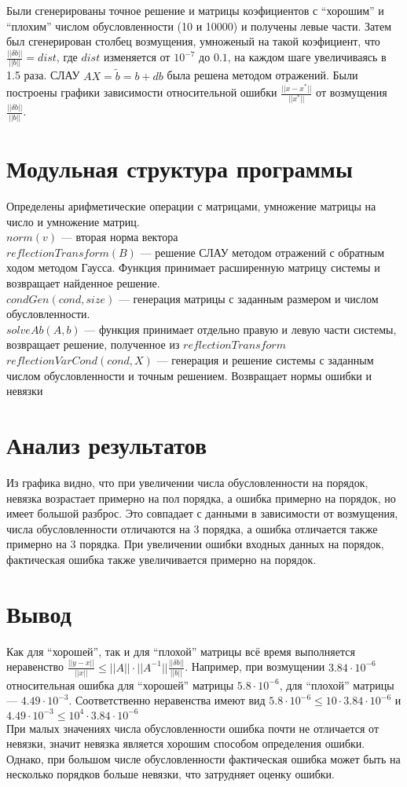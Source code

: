 \documentclass[11pt,a4paper]{article}
\begin{document}
Были сгенерированы точное решение и матрицы коэфициентов с ``хорошим'' и ``плохим'' числом обусловленности (10 и 10000) и получены левые части.
Затем был сгенерирован столбец возмущения, умноженый на такой коэфициент, что $ \frac{||\delta b||}{||b||} = dist$, где $dist$ изменяется от $10^{-7}$ до $0.1$, на каждом шаге увеличиваясь в 1.5 раза.
СЛАУ $AX = \tilde{b} = b + db$ была решена методом отражений. Были построены графики зависимости относительной ошибки $\frac{||x-x^{*}||}{||x^{*}||}$ от возмущения $\frac{||\delta b||}{||b||}$.

\section{Модульная структура программы}
Определены арифметические операции с матрицами, умножение матрицы на число и умножение матриц.\\
$norm(v)$ --- вторая норма вектора\\
$reflectionTransform(B)$ --- решение СЛАУ методом отражений с обратным ходом методом Гаусса. Функция принимает расширенную матрицу системы и возвращает найденное решение.\\
$condGen(cond,size)$ --- генерация матрицы с заданным размером и числом обусловленности.\\
$solveAb(A,b)$ --- функция принимает отдельно правую и левую части системы, возвращает решение, полученное из $reflectionTransform$\\
$reflectionVarCond(cond, X)$ --- генерация и решение системы с заданным числом обусловленности и точным решением. Возвращает нормы ошибки и невязки\\

\section{Анализ результатов}
Из графика видно, что при увеличении числа обусловленности на порядок, невязка возрастает примерно на пол порядка, а ошибка примерно на порядок, но имеет большой разброс.
Это совпадает с данными в зависимости от возмущения, числа обусловленности отличаются на 3 порядка, а ошибка отличается также примерно на 3 порядка.
При увеличении ошибки входных данных на порядок, фактическая ошибка также увеличивается примерно на порядок.
\section{Вывод}
Как для ``хорошей'', так и для ``плохой'' матрицы всё время выполняется неравенство $\frac{||y-x||}{||x||} \leq ||A||\cdot||A^{-1}|| \frac{||\delta b||}{||b||}$.
Например, при возмущении $3.84\cdot10^{-6}$ относительная ошибка для ``хорошей'' матрицы $5.8\cdot10^{-6}$, для ``плохой'' матрицы --- $4.49\cdot10^{-3}$.
Соответственно неравенства имеют вид $5.8\cdot10^{-6} \leq 10 \cdot 3.84\cdot10^{-6}$ и $4.49\cdot10^{-3} \leq 10^{4} \cdot3.84\cdot10^{-6}$\\
При малых значениях числа обусловленности ошибка почти не отличается от невязки, значит невязка является хорошим способом определения ошибки. Однако, при большом числе обусловленности фактическая ошибка может быть на несколько порядков больше невязки, что затрудняет оценку ошибки.
\end{document}
